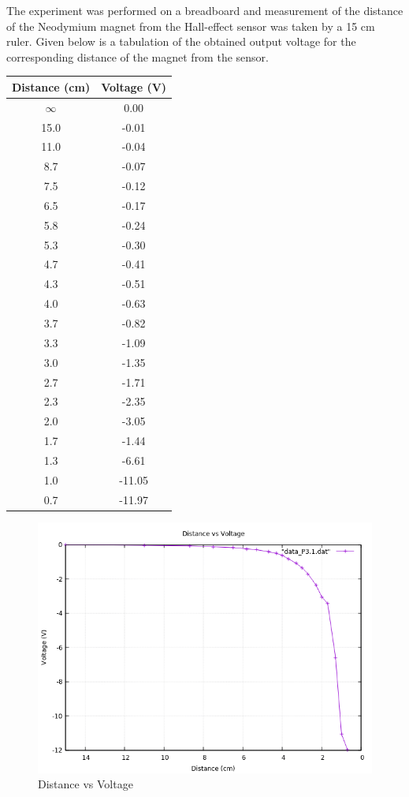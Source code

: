 \documentclass[12pt]{article}
\begin{document}
The experiment was performed on a breadboard and measurement of the distance of the Neodymium magnet from the Hall-effect sensor was taken by a 15 cm ruler. Given below is a tabulation of the obtained output voltage for the corresponding distance of the magnet from the sensor.
\begin{table}[h!]
\centering
\begin{tabular}{||c|c||}
\hline\hline
Distance (cm) & Voltage (V)\\ [0.5ex]
\hline\hline
\(\infty\) & 0.00\\
15.0 & -0.01\\
11.0 & -0.04\\
8.7 & -0.07\\
7.5 & -0.12\\
6.5 & -0.17\\
5.8 & -0.24\\
5.3 & -0.30\\
4.7 & -0.41\\
4.3 & -0.51\\
4.0 & -0.63\\
3.7 & -0.82\\
3.3 & -1.09\\
3.0 & -1.35\\
2.7 & -1.71\\
2.3 & -2.35\\
2.0 & -3.05\\
1.7 & -1.44\\
1.3 & -6.61\\
1.0 & -11.05\\
0.7 & -11.97\\ [1ex]
\hline\hline
\end{tabular}
\end{table}

\begin{figure}[H]
	\centering
	\includegraphics[width = 0.75\linewidth, trim = {0 0 0 0}, clip]{Part 1 - Distance vs Voltage.png}
	\caption{Distance vs Voltage}
\end{figure}
\end{document}
